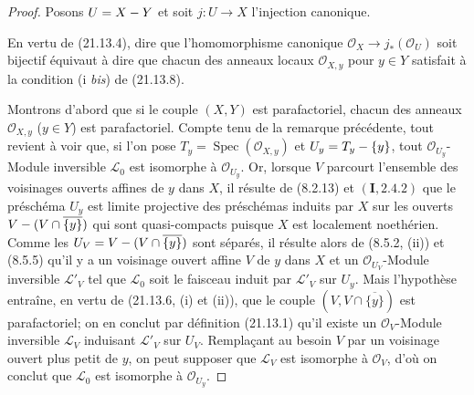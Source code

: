 \begin{proof}
Posons $U=X- Y$ et soit $j:U\to X$ l'injection canonique.

En vertu de (21.13.4), dire que l'homomorphisme canonique
$\mathcal O_X\to j_*(\mathcal O_U)$ soit bijectif équivaut à dire que chacun des
anneaux locaux $\mathcal O_{X,y}$ pour $y\in Y$ satisfait à la condition (i \emph{bis}) de
(21.13.8).

Montrons d'abord que si le couple $(X,Y)$ est parafactoriel, chacun des anneaux
$\mathcal O_{X,y}$ ($y\in Y$) est parafactoriel. Compte tenu de la remarque
précédente, tout revient à voir que, si l'on pose
$T_y=\operatorname{Spec}(\mathcal O_{X,y})$ et $U_y=T_y-\{y\}$, tout
$\mathcal O_{U_y}$-Module inversible $\mathscr L_0$ est isomorphe à
$\mathcal O_{U_y}$. Or, lorsque $V$ parcourt l'ensemble des voisinages ouverts
affines de $y$ dans $X$, il résulte de (8.2.13) et $(\mathbf I, 2.4.2)$ que le
préschéma $U_y$ est limite projective des préschémas induits par $X$ sur les ouverts
$V-(V\cap\overline{\{y\}})$ qui sont quasi-compacts puisque $X$ est localement
noethérien. Comme les $U_V=V-(V\cap\overline{\{y\}})$ sont séparés, il résulte alors de
(8.5.2, (ii)) et (8.5.5) qu'il y a un voisinage ouvert affine $V$ de $y$ dans $X$ et
un $\mathcal O_{U_V}$-Module inversible $\mathscr L'_V$ tel que $\mathscr L_0$ soit le
faisceau induit par $\mathscr L'_V$ sur $U_y$. Mais l'hypothèse entraîne, en vertu de
(21.13.6, (i) et (ii)), que le couple $(V,V\cap\overline{\{y\}})$ est parafactoriel;
on en conclut par définition (21.13.1) qu'il existe un $\mathcal O_V$-Module inversible
$\mathscr L_V$ induisant $\mathscr L'_V$ sur $U_V$. Remplaçant au besoin $V$ par un
voisinage ouvert plus petit de $y$, on peut supposer que $\mathscr L_V$ est isomorphe
à $\mathcal O_V$, d'où on conclut que $\mathscr L_0$ est isomorphe à
$\mathcal O_{U_y}$.


\end{proof}
